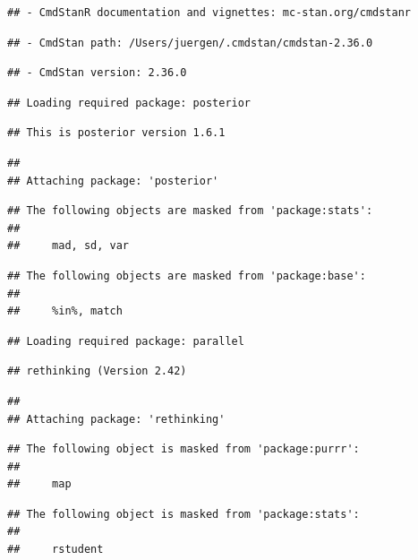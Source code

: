 \documentclass[
]{article}
\begin{document}
\begin{verbatim}
## - CmdStanR documentation and vignettes: mc-stan.org/cmdstanr
\end{verbatim}

\begin{verbatim}
## - CmdStan path: /Users/juergen/.cmdstan/cmdstan-2.36.0
\end{verbatim}

\begin{verbatim}
## - CmdStan version: 2.36.0
\end{verbatim}

\begin{verbatim}
## Loading required package: posterior
\end{verbatim}

\begin{verbatim}
## This is posterior version 1.6.1
\end{verbatim}

\begin{verbatim}
## 
## Attaching package: 'posterior'
\end{verbatim}

\begin{verbatim}
## The following objects are masked from 'package:stats':
## 
##     mad, sd, var
\end{verbatim}

\begin{verbatim}
## The following objects are masked from 'package:base':
## 
##     %in%, match
\end{verbatim}

\begin{verbatim}
## Loading required package: parallel
\end{verbatim}

\begin{verbatim}
## rethinking (Version 2.42)
\end{verbatim}

\begin{verbatim}
## 
## Attaching package: 'rethinking'
\end{verbatim}

\begin{verbatim}
## The following object is masked from 'package:purrr':
## 
##     map
\end{verbatim}

\begin{verbatim}
## The following object is masked from 'package:stats':
## 
##     rstudent
\end{verbatim}
\end{document}
